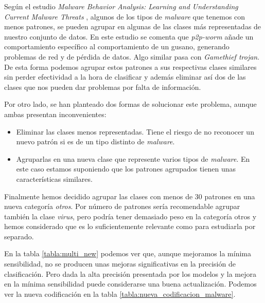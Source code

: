 Según el estudio \textit{Malware Behavior Analysis: Learning and Understanding Current Malware Threats} \cite{mba}, algunos de los tipos de \textit{malware} que tenemos con menos patrones, se pueden agrupar en algunas de las clases más representadas de nuestro conjunto de datos. En este estudio se comenta que \textit{p2p-worm} añade un comportamiento específico al comportamiento de un gusano, generando problemas de red y de pérdida de datos. Algo similar pasa con \textit{Gamethief trojan}. De esta forma podemos agrupar estos patrones a sus respectivas clases similares sin perder efectividad a la hora de clasificar y además eliminar así dos de las clases que nos pueden dar problemas por falta de información.

\vspace{1em}

Por otro lado, se han planteado dos formas de solucionar este problema, aunque ambas presentan inconvenientes:

\begin{itemize}
	\item Eliminar las clases menos representadas. Tiene el riesgo de no reconocer un nuevo patrón si es de un tipo distinto de \textit{malware}.
	\item Agruparlas en una nueva clase que represente varios tipos de \textit{malware}. En este caso estamos suponiendo que los patrones agrupados tienen unas características similares.
\end{itemize}

\vspace{1em}

Finalmente hemos decidido agrupar las clases con menos de 30 patrones en una nueva categoría \textit{otros}. Por número de patrones sería recomendable agrupar también la clase \textit{virus}, pero podría tener demasiado peso en la categoría otros y hemos considerado que es lo suficientemente relevante como para estudiarla por separado.

\vspace{1em}

En la tabla \ref{tabla:multi_new} podemos ver que, aunque mejoramos la mínima sensibilidad, no se producen unas mejoras significativas en la precisión de clasificación. Pero dada la alta precisión presentada por los modelos y la mejora en la mínima sensibilidad puede considerarse una buena actualización. Podemos ver la nueva codificación en la tabla \ref{tabla:nueva_codificacion_malware}.

